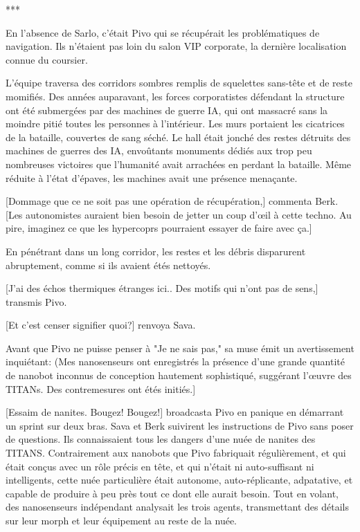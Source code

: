 \begin{center} *** \end{center} 

En l'absence de Sarlo, c'était Pivo qui se récupérait les problématiques de navigation. Ils n'étaient pas loin du salon VIP corporate, la dernière localisation connue du coursier. 

L'équipe traversa des corridors sombres remplis de squelettes sans-tête et de reste momifiés. Des années auparavant, les forces corporatistes défendant la structure ont été submergées par des machines de guerre IA, qui ont massacré sans la moindre pitié toutes les personnes à l'intérieur. Les murs portaient les cicatrices de la bataille, couvertes de sang séché. Le hall était jonché des restes détruits des machines de guerres des IA, envoûtants monuments dédiés aux trop peu nombreuses victoires que l'humanité avait arrachées en perdant la bataille. Même réduite à l'état d'épaves, les machines avait une présence menaçante. 

[Dommage que ce ne soit pas une opération de récupération,] commenta Berk. [Les autonomistes auraient bien besoin de jetter un coup d'œil à cette techno. Au pire, imaginez ce que les hypercoprs pourraient essayer de faire avec ça.] 

En pénétrant dans un long corridor, les restes et les débris disparurent abruptement, comme si ils avaient étés nettoyés. 

[J'ai des échos thermiques étranges ici.. Des motifs qui n'ont pas de sens,] transmis Pivo. 

[Et c'est censer signifier quoi?] renvoya Sava. 

Avant que Pivo ne puisse penser à "Je ne sais pas," sa muse émit un avertissement inquiétant: (Mes nanosenseurs ont enregistrés la présence d'une grande quantité de nanobot inconnus de conception hautement sophistiqué, suggérant l'œuvre des TITANs. Des contremesures ont étés initiés.] 

[Essaim de nanites. Bougez! Bougez!] broadcasta Pivo en panique en démarrant un sprint sur deux bras. Sava et Berk suivirent les instructions de Pivo sans poser de questions. Ils connaissaient tous les dangers d'une nuée de nanites des TITANS. Contrairement aux nanobots que Pivo fabriquait régulièrement, et qui était conçus avec un rôle précis en tête, et qui n'était ni auto-suffisant ni intelligents, cette nuée particulière était autonome, auto-réplicante, adpatative, et capable de produire à peu près tout ce dont elle aurait besoin. Tout en volant, des nanosenseurs indépendant analysait les trois agents, transmettant des détails sur leur morph et leur équipement au reste de la nuée. 

